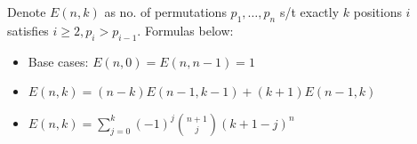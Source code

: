 Denote $E(n, k)$ as no. of permutations $p_1,\dotsc,p_n$ s/t exactly $k$ 
positions $i$ satisfies $i \geq 2, p_i > p_{i - 1}$. Formulas below:
\begin{itemize}
    \item Base cases: $E(n, 0) = E(n, n - 1) = 1$
    
    \item $E(n, k) = (n - k)E(n - 1,k - 1) + (k + 1)E(n - 1,k)$
    
    \item $\displaystyle E(n, k) = \sum_{j = 0}^k (-1)^j\binom{n + 1}{j}(k + 1 - j)^n$
\end{itemize}